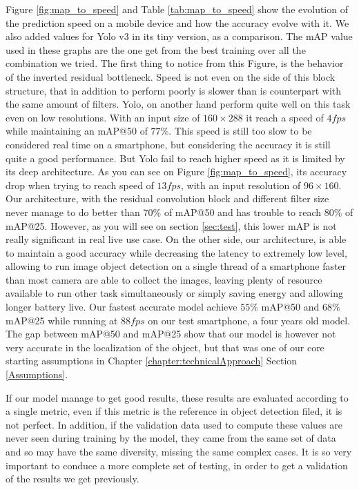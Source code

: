 Figure \ref{fig:map_to_speed} and Table \ref{tab:map_to_speed} show the evolution of the prediction speed on a mobile device and how the accuracy evolve with it. We also added values for Yolo v3 in its tiny version, as a comparison. The mAP value used in these graphs are the one get from the best training over all the combination we tried. The first thing to notice from this Figure, is the behavior of the inverted residual bottleneck. Speed is not even on the side of this block structure, that in addition to perform poorly is slower than is counterpart with the same amount of filters. Yolo, on another hand perform quite well on this task even on low resolutions. With an input size of $160\times288$ it reach a speed of $4fps$ while maintaining an mAP@50 of $77\%$. This speed is still too slow to be considered real time on a smartphone, but considering the accuracy it is still quite a good performance. But Yolo fail to reach higher speed as it is limited by its deep architecture. As you can see on Figure \ref{fig:map_to_speed}, its accuracy drop when trying to reach speed of $13fps$, with an input resolution of $96\times160$. Our architecture, with the residual convolution block and different filter size never manage to do better than $70\%$ of mAP@50 and has trouble to reach $80\%$ of mAP@25. However, as you will see on section \ref{sec:test}, this lower mAP is not really significant in real live use case. On the other side, our architecture, is able to maintain a good accuracy while decreasing the latency to extremely low level, allowing to run image object detection on a single thread of a smartphone faster than most camera are able to collect the images, leaving plenty of resource available to run other task simultaneously or simply saving energy and allowing longer battery live. Our fastest accurate model achieve $55\%$ mAP@50 and $68\%$ mAP@25 while running at $88fps$ on our test smartphone, a four years old model. The gap between mAP@50 and mAP@25 show that our model is however not very accurate in the localization of the object, but that was one of our core starting assumptions in Chapter \ref{chapter:technicalApproach} Section \ref{Assumptions}.

If our model manage to get good results, these results are evaluated according to a single metric, even if this metric is the reference in object detection filed, it is not perfect. In addition, if the validation data used to compute these values are never seen during training by the model, they came from the same set of data and so may have the same diversity, missing the same complex cases. It is so very important to conduce a more complete set of testing, in order to get a validation of the results we get previously.

